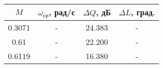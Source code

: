 \begin{tabular}{|c|c|c|c|}
\hline
   $M$ & $\omega_{ср}$, рад/с &  $\Delta Q$, дБ & $\Delta L$, град. \\
\hline
0.3071 &                    - &          24.383 &                 - \\
  0.61 &                    - &          22.200 &                 - \\
0.6119 &                    - &          16.380 &                 - \\
\hline
\end{tabular}
